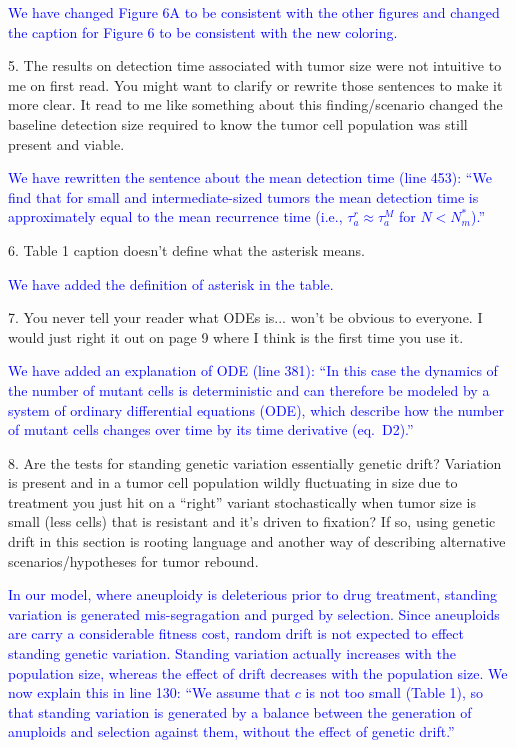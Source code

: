 \documentclass[12pt]{extarticle}
\begin{document}
\textcolor{blue}{ %
We have changed Figure 6A to be consistent with the other figures and changed the caption for Figure 6 to be consistent with the new coloring.
} 

5. The results on detection time associated with tumor size were not intuitive to me on first read. You might want to clarify or rewrite those sentences to make it more clear. It read to me like something about this finding/scenario changed the baseline detection size required to know the tumor cell population was still present and viable.

\textcolor{blue}{%
We have rewritten the sentence about the mean detection time (line 453): ``We find that for small and intermediate-sized tumors the mean detection time is approximately equal to the mean recurrence time (i.e., $\tau_a^r\approx\tau_a^{M}$ for $N<N_m^*$).''
} 

6. Table 1 caption doesn't define what the asterisk means.

\textcolor{blue}{ %
We have added the definition of asterisk in the table.
} 

7. You never tell your reader what ODEs is... won't be obvious to everyone. I would just right it out on page 9 where I think is the first time you use it.

\textcolor{blue}{%
We have added an explanation of ODE (line 381): ``In this case the dynamics of the number of mutant cells is deterministic and can therefore be modeled by a system of ordinary differential equations (ODE), which describe how the number of mutant cells changes over time by its time derivative (eq.~D2).''
} 

8. Are the tests for standing genetic variation essentially genetic drift? Variation is present and in a tumor cell population wildly fluctuating in size due to treatment you just hit on a ``right'' variant stochastically when tumor size is small (less cells) that is resistant and it's driven to fixation? If so, using genetic drift in this section is rooting language and another way of describing alternative scenarios/hypotheses for tumor rebound.

\textcolor{blue}{In our model, where aneuploidy is deleterious prior to drug treatment, standing variation is generated mis-segragation and purged by selection. Since aneuploids are carry a considerable fitness cost, random drift is not expected to effect standing genetic variation. Standing variation actually increases with the population size, whereas the effect of drift decreases with the population size. We now explain this in line 130: ``We assume that $c$ is not too small (Table 1), so that standing variation is generated by a balance between the generation of anuploids and selection against them, without the effect of genetic drift.''
} 
\end{document}
